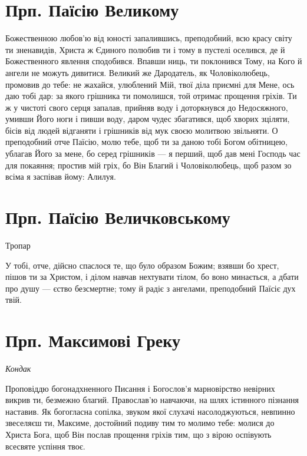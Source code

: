 \documentclass[chapters.tex]{subfiles}
\begin{document}
\section{Прп. Паїсію Великому}
Божественною любов’ю від юності запалившись, преподобний, всю красу світу ти зненавидів, Христа ж Єдиного полюбив ти і тому в пустелі оселився, де й Божественного явлення сподобився. Впавши ниць, ти поклонився Тому, на Кого й ангели не можуть дивитися. Великий же Дародатель, як Чоловіколюбець, промовив до тебе: не жахайся, улюблений Мій, твої діла приємні для Мене, ось даю тобі дар: за якого грішника ти помолишся, той отримає прощення гріхів. Ти ж у чистоті свого серця запалав, прийняв воду і доторкнувся до Недосяжного, умивши Його ноги і пивши воду, даром чудес збагатився, щоб хворих зціляти, бісів від людей відганяти і грішників від мук своєю молитвою звільняти. О преподобний отче Паїсію, молю тебе, щоб ти за даною тобі Богом обітницею, ублагав Його за мене, бо серед грішників — я перший, щоб дав мені Господь час для покаяння; простив мій гріх, бо Він Благий і Чоловіколюбець, щоб разом зо всіма я заспівав йому: Алилуя.

\section{Прп. Паїсію Величковському}
Тропар

У тобі, отче, дійсно спаслося те, що було образом Божим; взявши бо хрест, пішов ти за Христом, і ділом навчав нехтувати тілом, бо воно минається, а дбати про душу — єство безсмертне; тому й радіє з ангелами, преподобний Паїсіє дух твій.

\section{Прп. Максимові Греку}
\emph{Кондак}

Проповіддю богонадхненного Писання і Богослов’я марновірство невірних викрив ти, безмежно благий. Православ’ю навчаючи, на шлях істинного пізнання наставив. Як богогласна сопілка, звуком якої слухачі насолоджуються, невпинно звеселяєш ти, Максиме, достойний подиву тим то молимо тебе: молися до Христа Бога, щоб Він послав прощення гріхів тим, що з вірою оспівують всесвяте успіння твоє.
\end{document}
